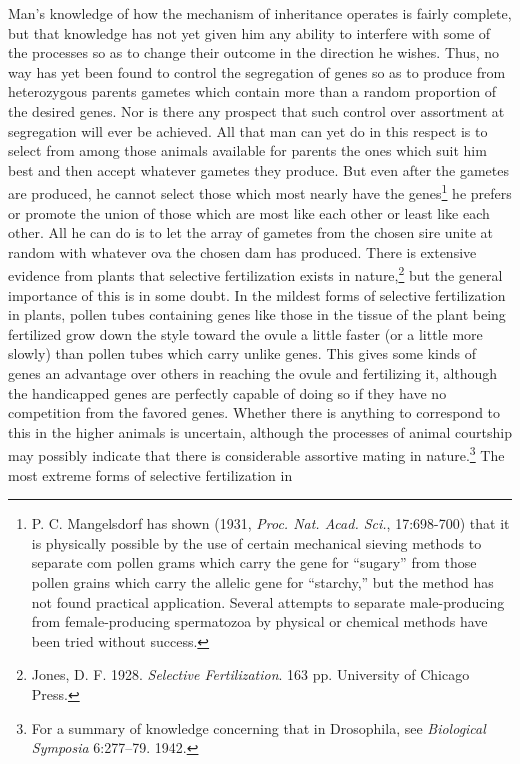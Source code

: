 Man's knowledge of how the mechanism of inheritance operates is
fairly complete, but that knowledge has not yet given him any ability to
interfere with some of the processes so as to change their outcome in the
direction he wishes. Thus, no way has yet been found to control the
segregation of genes so as to produce from heterozygous parents gametes
which contain more than a random proportion of the desired genes.
Nor is there any prospect that such control over assortment at segregation
will ever be achieved. All that man can yet do in this respect is to
select from among those animals available for parents the ones which
suit him best and then accept whatever gametes they produce. But even
after the gametes are produced, he cannot select those which most nearly
have the genes\footnote{P. C. Mangelsdorf has shown (1931, \textit{Proc.
Nat. Acad. Sci.}, 17:698-700) that it is physically possible by the use of
certain mechanical sieving methods to separate com pollen grams which carry
the gene for ``sugary'' from those pollen grains which carry the allelic gene
for ``starchy,'' but the method has not found practical application. Several
attempts to separate male-producing from female-producing spermatozoa by
physical or chemical methods have been tried without success.} he prefers or
promote the union of those which are most like each other or least like each
other. All he can do is to let the array of gametes from the chosen sire unite
at random with whatever ova the chosen dam has produced. There is extensive evidence from
plants that selective fertilization exists in nature,\footnote{Jones, D. F. 1928.
\textit{Selective Fertilization}. 163 pp. University of Chicago Press.} but the general
importance of this is in some doubt. In the mildest forms of selective
fertilization in plants, pollen tubes containing genes like those in the
tissue of the plant being fertilized grow down the style toward the
ovule a little faster (or a little more slowly) than pollen tubes which
carry unlike genes. This gives some kinds of genes an advantage over
others in reaching the ovule and fertilizing it, although the handicapped
genes are perfectly capable of doing so if they have no competition
from the favored genes. Whether there is anything to correspond to
this in the higher animals is uncertain, although the processes of animal
courtship may possibly indicate that there is considerable assortive
mating in nature.\footnote{For a summary of knowledge concerning that in Drosophila, see \textit{Biological
Symposia} 6:277--79. 1942.} The most extreme forms of selective fertilization in
